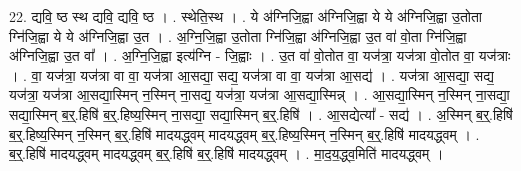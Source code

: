 \documentclass[17pt]{extarticle}
\begin{document}
22. द्यवि॒ ष्ठ स्थ द्यवि॒ द्यवि॒ ष्ठ । . स्थेति॒स्थ । . ये अ॑ग्निजि॒ह्वा अ॑ग्निजि॒ह्वा ये ये अ॑ग्निजि॒ह्वा उ॒तोता ग्नि॑जि॒ह्वा ये ये अ॑ग्निजि॒ह्वा उ॒त । . अ॒ग्नि॒जि॒ह्वा उ॒तोता ग्नि॑जि॒ह्वा अ॑ग्निजि॒ह्वा उ॒त वा॑ वो॒ता ग्नि॑जि॒ह्वा अ॑ग्निजि॒ह्वा उ॒त वा᳚ । . अ॒ग्नि॒जि॒ह्वा इत्य॑ग्नि - जि॒ह्वाः । . उ॒त वा॑ वो॒तोत वा॒ यज॑त्रा॒ यज॑त्रा वो॒तोत वा॒ यज॑त्राः । . वा॒ यज॑त्रा॒ यज॑त्रा वा वा॒ यज॑त्रा आ॒सद्या॒ सद्य॒ यज॑त्रा वा वा॒ यज॑त्रा आ॒सद्य॑ । . यज॑त्रा आ॒सद्या॒ सद्य॒ यज॑त्रा॒ यज॑त्रा आ॒सद्या॒स्मिन् न॒स्मिन् ना॒सद्य॒ यज॑त्रा॒ यज॑त्रा आ॒सद्या॒स्मिन्न् । . आ॒सद्या॒स्मिन् न॒स्मिन् ना॒सद्या॒ सद्या॒स्मिन् ब॒र्॒.हिषि॑ ब॒र्॒.हिष्य॒स्मिन् ना॒सद्या॒ सद्या॒स्मिन् ब॒र्॒.हिषि॑ । . आ॒सद्येत्या᳚ - सद्य॑ । . अ॒स्मिन् ब॒र्॒.हिषि॑ ब॒र्॒.हिष्य॒स्मिन् न॒स्मिन् ब॒र्॒.हिषि॑ मादयद्ध्वम् मादयद्ध्वम् ब॒र्॒.हिष्य॒स्मिन् न॒स्मिन् ब॒र्॒.हिषि॑ मादयद्ध्वम् । . ब॒र्॒.हिषि॑ मादयद्ध्वम् मादयद्ध्वम् ब॒र्॒.हिषि॑ ब॒र्॒.हिषि॑ मादयद्ध्वम् । . मा॒द॒य॒द्ध्व॒मिति॑ मादयद्ध्वम् । \newline
\pagebreak
\end{document}
